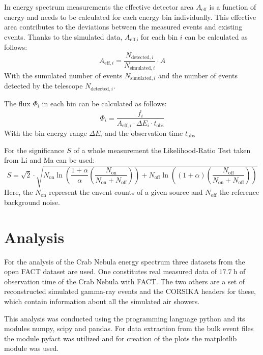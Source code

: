     In energy spectrum measurements the effective detector area $A_\text{eff}$ is a function of energy and needs to be calculated for each energy bin individually.
    This effective area contributes to the deviations between the measured events and existing events.
    Thanks to the simulated data, $A_\text{eff,i}$ for each bin $i$ can be calculated as follows:
    \begin{equation}
        A_{\text{eff},i} = \frac{N_{\text{detected},i}}{N_{\text{simulated},i}} \cdot A
        \label{eq:acceptance}
    \end{equation}
    With the sumulated number of events $N_{\text{simulated},i}$ and the number of events detected by the telescope $N_{\text{detected},i}$.

    The flux $\Phi_i$ in each bin can be calculated as follows:
    \begin{equation}
        \Phi_i = \frac{\hat{f}_i}{A_{\text{eff},i} \cdot \Delta E_i \cdot t_\text{obs}}
        \label{eq:flux}
    \end{equation}
    With the bin energy range $\Delta E_i$ and the observation time $t_\text{obs}$
    
    For the significance $S$ of a whole measurement the Likelihood-Ratio Test taken from Li and Ma can be used:
    \begin{equation}
        S = \sqrt{2} \cdot \sqrt{N_\text{on} \ln\left( \frac{1 + \alpha}{\alpha} \left( \frac{N_\text{on}}{N_\text{on} + N_\text{off}} \right) \right) + N_\text{off} \ln\left( (1 + \alpha) \left( \frac{N_\text{off}}{N_\text{on} + N_\text{off}} \right) \right) }
        \label{eq:significance}
    \end{equation}
    Here, the $N_\text{on}$ represent the envent counts of a given source and $N_\text{off}$ the reference background noise.
%
%
    \section{Analysis}
        For the analysis of the Crab Nebula energy spectrum three datasets from the open FACT dataset are used.\cite{FACTData}
        \newline
        One constitutes real measured data of $\SI{17.7}{\hour}$ of observation time of the Crab Nebula with FACT.
        The two others are a set of reconstructed simulated gamma-ray events and the CORSIKA headers for these, which contain information about all the simulated air showers.

        This analysis was conducted using the programming language python and its modules numpy\cite{numpy}, scipy\cite{scipy} and pandas\cite{pandas}.
        For data extraction from the bulk event files the module pyfact was utilized and for creation of the plots the matplotlib\cite{matplotlib} module was used.
